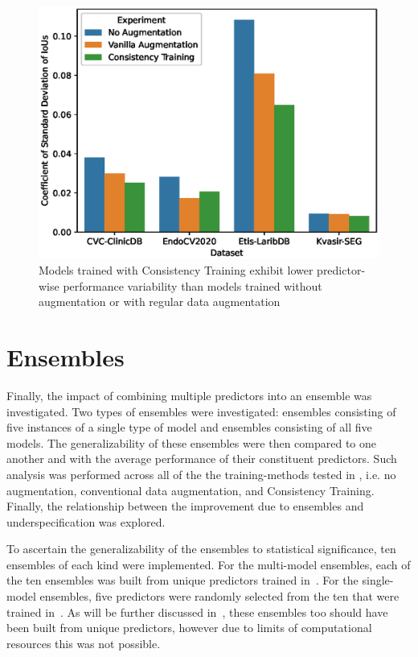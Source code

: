 \begin{figure}[htb]
    \centering
    \includegraphics[width=\linewidth]{illustrations/consistency_training_cstd.eps}
    \caption[Consistency Training performance variability]{Models trained with Consistency Training exhibit lower predictor-wise performance variability than models trained without augmentation or with regular data augmentation}
    \label{fig:consistency_cstd}
\end{figure}

\section{Ensembles}\label{ensembles}

Finally, the impact of combining multiple predictors into an ensemble was investigated. Two types of ensembles were investigated: ensembles consisting of five instances of a single type of model and ensembles consisting of all five models. The generalizability of these ensembles were then compared to one another and with the average performance of their constituent predictors. Such analysis was performed across all of the the training-methods tested in , i.e. no augmentation, conventional data augmentation, and Consistency Training. Finally, the relationship between the improvement due to ensembles and underspecification was explored. 

To ascertain the generalizability of the ensembles to statistical significance, ten ensembles of each kind were implemented. For the multi-model ensembles, each of the ten ensembles was built from unique predictors trained in~.  For the single-model ensembles, five predictors were randomly selected from the ten that were trained in~. As will be further discussed in~, these ensembles too should have been built from unique predictors, however due to limits of computational resources this was not possible. 

